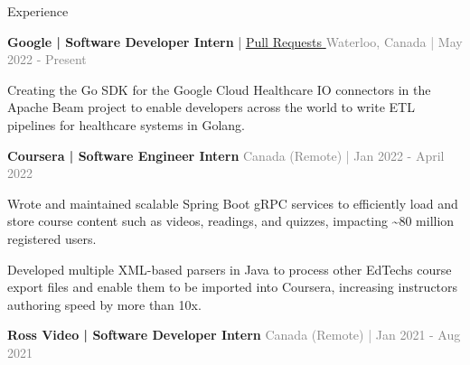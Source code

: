 \documentclass[hidelinks]{resume} %
\begin{document}
\vspace{-.20cm}
\begin{rSection}{Experience}
\vspace{-.1cm}
\begin{rSubsection}{\textbf{Google | Software Developer Intern} |
\href{https://github.com/apache/beam/pulls?q=state\%3Amerged+author\%3Alnogueir}{\underline{Pull Requests} \faGithub} }{\textcolor{gray}{\small Waterloo, Canada | May 2022 - Present}}{}
        \par
        \begin{bulletpoints}
            \vspace{-.10cm}
            \item Creating the Go SDK for the Google Cloud Healthcare IO connectors in the Apache Beam project to enable developers across the world to write ETL pipelines for healthcare systems in Golang.
             \vspace{-.10cm}
        \end{bulletpoints}
\end{rSubsection}
\begin{rSubsection}{\textbf{Coursera | Software Engineer Intern} }{\textcolor{gray}{\small Canada (Remote) | Jan 2022 - April 2022}}{}

    \begin{bulletpoints}
        \vspace{-.10cm}
        \item Wrote and maintained scalable Spring Boot gRPC services to efficiently load and store course content such as videos, readings, and quizzes, impacting \textasciitilde 80 million registered users.
        \vspace{-.13cm}
        \item Developed multiple XML-based parsers in Java to process other EdTechs course export files and enable them to be imported into Coursera, increasing instructors authoring speed by more than 10x.
        \vspace{-.10cm}
    \end{bulletpoints}
\end{rSubsection}
\begin{rSubsection}{\textbf{Ross Video | Software Developer Intern} }{\textcolor{gray}{\small Canada (Remote) | Jan 2021 - Aug 2021}}{}


\end{rSubsection}
\end{rSection}
\end{document}
